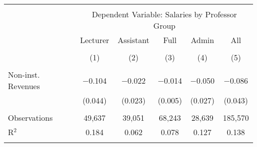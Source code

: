 
\begin{tabular}{@{\extracolsep{5pt}}lccccc} 
\\[-1.8ex]\hline 
\hline \\[-1.8ex] 
 & \multicolumn{5}{c}{Dependent Variable: Salaries by Professor Group} \\ 
\cline{2-6} 
 & Lecturer & Assistant & Full & Admin & All \\ 
\\[-1.8ex] & (1) & (2) & (3) & (4) & (5)\\ 
\hline \\[-1.8ex] 
 Non-inst. Revenues & $-$0.104 & $-$0.022 & $-$0.014 & $-$0.050 & $-$0.086 \\ 
  & (0.044) & (0.023) & (0.005) & (0.027) & (0.043) \\ 
 \hline \\[-1.8ex] 
Observations & 49,637 & 39,051 & 68,243 & 28,639 & 185,570 \\ 
R$^{2}$ & 0.184 & 0.062 & 0.078 & 0.127 & 0.138 \\ 
\hline 
\hline \\[-1.8ex] 
\end{tabular} 
